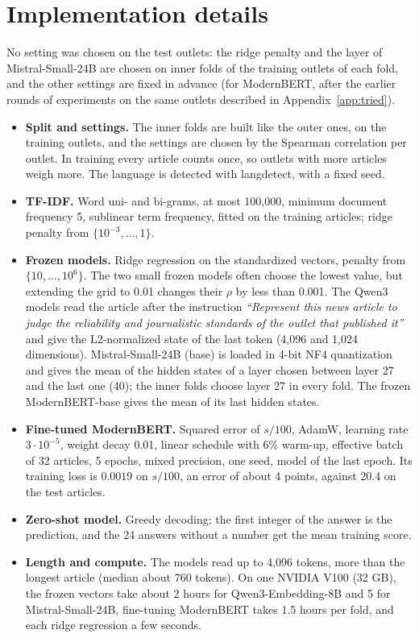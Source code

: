 \documentclass[11pt,a4paper]{article}
\begin{document}
\section{Implementation details}\label{app:impl}
No setting was chosen on the test outlets: the ridge penalty and the layer of Mistral-Small-24B are chosen on inner
folds of the training outlets of each fold, and the other settings are fixed in advance (for ModernBERT, after the
earlier rounds of experiments on the same outlets described in Appendix~\ref{app:tried}).
\begin{itemize}
  \item \textbf{Split and settings.} The inner folds are built like the outer ones, on the training outlets, and the
        settings are chosen by the Spearman correlation per outlet. In training every article counts once, so outlets
        with more articles weigh more. The language is detected with langdetect, with a fixed seed.
  \item \textbf{TF-IDF.} Word uni- and bi-grams, at most 100,000, minimum document frequency 5, sublinear term frequency,
        fitted on the training articles; ridge penalty from $\{10^{-3}, \ldots, 1\}$.
  \item \textbf{Frozen models.} Ridge regression on the standardized vectors, penalty from $\{10, \ldots, 10^6\}$. The
        two small frozen models often choose the lowest value, but extending the grid to 0.01 changes their $\rho$ by
        less than 0.001. The Qwen3 models read the article after the instruction \emph{``Represent this news article to
        judge the reliability and journalistic standards of the outlet that published it''} and give the L2-normalized
        state of the last token (4,096 and 1,024 dimensions). Mistral-Small-24B (base) is loaded in 4-bit NF4
        quantization and gives the mean of the hidden states of a layer chosen between layer 27 and the last one (40);
        the inner folds choose layer 27 in every fold. The frozen ModernBERT-base gives the mean of its last hidden
        states.
  \item \textbf{Fine-tuned ModernBERT.} Squared error of $s/100$, AdamW, learning rate $3 \cdot 10^{-5}$, weight decay
        0.01, linear schedule with 6\% warm-up, effective batch of 32 articles, 5 epochs, mixed precision, one seed, model
        of the last epoch. Its training loss is $0.0019$ on $s/100$, an error of about 4 points, against 20.4 on the
        test articles.
  \item \textbf{Zero-shot model.} Greedy decoding; the first integer of the answer is the prediction, and the 24 answers
        without a number get the mean training score.
  \item \textbf{Length and compute.} The models read up to 4,096 tokens, more than the longest article (median about 760
        tokens). On one NVIDIA V100 (32 GB), the frozen vectors take about 2 hours for Qwen3-Embedding-8B and 5 for
        Mistral-Small-24B, fine-tuning ModernBERT takes 1.5 hours per fold, and each ridge regression a few seconds.
\end{itemize}
\end{document}
